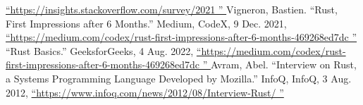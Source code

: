 \documentclass{article}
\theoremstyle{theorem}
\theoremstyle{definition}
\theoremstyle{remark}
\begin{document}
\begin{thebibliography}{99}
\href{https://insights.stackoverflow.com/survey/2021}  {“https://insights.stackoverflow.com/survey/2021
” }
Vigneron, Bastien. “Rust, First Impressions after 6 Months.” Medium, CodeX, 9 Dec. 2021, 
\href{https://medium.com/codex/rust-first-impressions-after-6-months-469268ed7dc}  {“https://medium.com/codex/rust-first-impressions-after-6-months-469268ed7dc
” }
“Rust Basics.” GeeksforGeeks, 4 Aug. 2022, 
\href{ https://www.geeksforgeeks.org/rust-basics/}  {“https://medium.com/codex/rust-first-impressions-after-6-months-469268ed7dc
” }
Avram, Abel. “Interview on Rust, a Systems Programming Language Developed by Mozilla.” InfoQ, InfoQ, 3 Aug. 2012, 
\href{https://www.infoq.com/news/2012/08/Interview-Rust/}  {“https://www.infoq.com/news/2012/08/Interview-Rust/
” }
\end{thebibliography}
\end{document}
